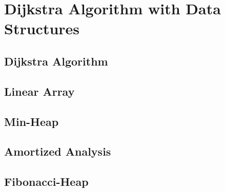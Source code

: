 \chapter{Dijkstra Algorithm with Data Structures}

\section{Dijkstra Algorithm}

\section{Linear Array}

\section{Min-Heap}

\section{Amortized Analysis}

\section{Fibonacci-Heap}